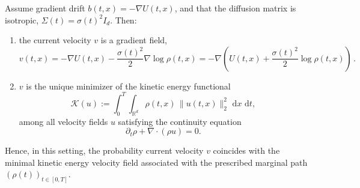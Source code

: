 \documentclass[10pt,a4paper]{amsart}
\begin{document}
\begin{proposition}
Assume gradient drift $b(t,x) = -\nabla U(t,x)$, and that the diffusion matrix is isotropic, $\Sigma(t) = \sigma(t)^2 I_d$.
Then:
\begin{enumerate}
    \item the current velocity \(v\) is a gradient field,
    \begin{equation*}
        v(t,x)
        = -\nabla U(t,x) - \frac{\sigma(t)^2}{2}\nabla \log \rho(t,x)
        = -\nabla\!\left(U(t,x) + \frac{\sigma(t)^2}{2}\log \rho(t,x)\right)\,.
    \end{equation*}
    \item \(v\) is the unique minimizer of the kinetic energy functional
    \begin{equation*}
        \mathcal{K}(u)
        :=
        \int_0^T \int_{\mathbb{R}^d} \rho(t,x)\,\|u(t,x)\|^2_2 \,\,\mathrm{d} x\,\,\mathrm{d} t,
    \end{equation*}
    among all velocity fields \(u\) satisfying the continuity equation
    \begin{equation*}
        \partial_t \rho + \nabla \cdot (\rho u) = 0.
    \end{equation*}
\end{enumerate}
Hence, in this setting, the probability current velocity \(v\) coincides with the minimal kinetic energy velocity field associated with the prescribed marginal path \((\rho(t))_{t\in[0,T]}\).
\end{proposition}
\end{document}
